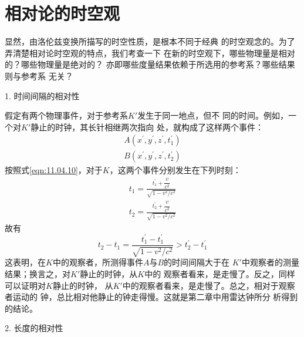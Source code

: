 \section{相对论的时空观}\label{sec:11.05}

显然，由洛伦兹变换所描写的时空性质，是根本不同于经典
的时空观念的。为了弄清楚相对论时空观的特点，我们考查一下
在新的时空观下，哪些物理量是相对的？哪些物理量是绝对的？
亦即哪些度量结果依赖于所选用的参考系？哪些结果则与参考系
无关？

\textsf{1. 时间间隔的相对性}

假定有两个物理事件，对于参考系$ K' $发生于同一地点，但不
同的时间。例如，一个对$ K' $静止的时钟，其长针相继两次指向
处，就构成了这样两个事件：
\begin{align*}
    A \left( x ^ { \prime } , y ^ { \prime } , z ^ { \prime } , t _ { 1 } ^ { \prime } \right) \\
    B \left( x ^ { \prime } , y ^ { \prime } , z ^ { \prime } , t _ { 2 } ^ { \prime } \right)
\end{align*}
按照式\eqref{eqn:11.04.10}，对于$ K $，这两个事件分别发生在下列时刻：
\begin{align*}
    t _ { 1 } = \frac { t _ { 1 } ^ { \prime } + \dfrac { v } { c ^ { 2 } } } { \sqrt { 1 - v ^ { 2 } / c ^ { 2 } } }  \\
    t _ { 2 } = \frac { t _ { 2 } ^ { \prime } + \dfrac { v } { c ^ { 2 } } } { \sqrt { 1 - v ^ { 2 } / c ^ { 2 } } }
\end{align*}
故有
\begin{equation}\label{eqn:11.05.01}
    t _ { 2 } - t _ { 1 } = \frac { t _ { 1 } ^ { \prime } - t _ { 1 } ^ { \prime } } { \sqrt{ 1 - v ^ { 2 } / c ^ { 2 } } } > t _ 2 ^ { \prime } - t _ 1 ^ { \prime }
\end{equation}
这表明，在$ K $中的观察者，所测得事件$ A $与$ B $的时间间隔大于在
$ K ' $中观察者的测量结果；换言之，对$ K ' $静止的时钟，从$ K $中的
观察者看来，是走慢了。反之，同样可以证明对$ K $静止的时钟，
从$ K ' $中的观察者看来，是走慢了。总之，相对于观察者运动的
\clearpage\noindent
钟，总比相对他静止的钟走得慢。这就是第二章中用雷达钟所分
析得到的结论。

\textsf{2. 长度的相对性}

